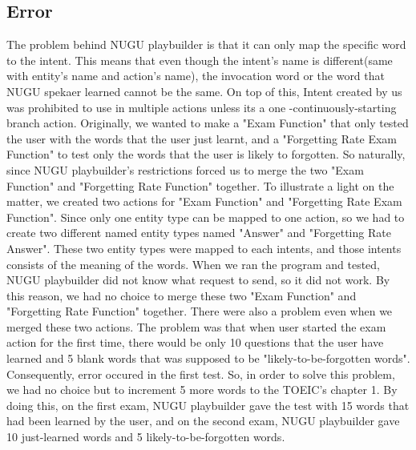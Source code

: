 \documentclass[conference]{IEEEtran}
\begin{document}
    \subsection{Error}
        The problem behind NUGU playbuilder is that it can only map the specific word to the intent. This means that even though the intent's name is different(same with entity's name and action's name), the invocation word or the word that NUGU spekaer learned cannot be the same. On top of this, Intent created by us was prohibited to use in multiple actions unless its a one -continuously-starting branch action. Originally, we wanted to make a "Exam Function" that only tested the user with the words that the user just learnt, and a "Forgetting Rate Exam Function" to test only the words that the user is likely to forgotten. So naturally, since NUGU playbuilder's restrictions forced us to merge the two "Exam Function" and "Forgetting Rate Function" together. To illustrate a light on the matter, we created two actions for "Exam Function" and "Forgetting Rate Exam Function". Since only one entity type can be mapped to one action, so we had to create two different named entity types named "Answer" and "Forgetting Rate Answer". These two entity types were mapped to each intents, and those intents consists of the meaning of the words. When we ran the program and tested, NUGU playbuilder did not know what request to send, so it did not work. By this reason, we had no choice to merge these two "Exam Function" and "Forgetting Rate Function" together.
        There were also a problem even when we merged these two actions. The problem was that when user started the exam action for the first time, there would be only 10 questions that the user have learned and 5 blank words that was supposed to be "likely-to-be-forgotten words". Consequently, error occured in the first test. So, in order to solve this problem, we had no choice but to increment 5 more words to the TOEIC's chapter 1. By doing this, on the first exam, NUGU playbuilder gave the test with 15 words that had been learned by the user, and on the second exam, NUGU playbuilder gave 10 just-learned words and 5 likely-to-be-forgotten words.
\end{document}
